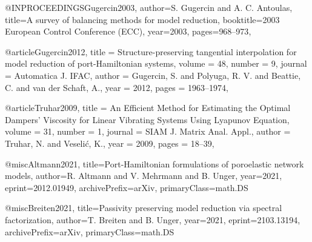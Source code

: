 @INPROCEEDINGS{Gugercin2003,
  author={S. {Gugercin} and A. C. {Antoulas}},
  title={A survey of balancing methods for model reduction}, 
  booktitle={2003 European Control Conference (ECC)}, 
  year={2003},
  pages={968--973},
}

@article{Gugercin2012,
	title = {Structure-preserving tangential interpolation for model reduction of port-{Hamiltonian} systems},
	volume = {48},
	number = {9},
	journal = {Automatica J. IFAC},
	author = {Gugercin, S. and Polyuga, R. V. and Beattie, C. and van der Schaft, A.},
	year = {2012},
	pages = {1963--1974},
}

@article{Truhar2009,
	title = {An Efficient Method for Estimating the Optimal Dampers' Viscosity for Linear Vibrating Systems Using {L}yapunov Equation},
	volume = {31},
	number = {1},
	journal = {SIAM J. Matrix Anal. Appl.},
	author = {Truhar, N. and Veseli\'c, K.},
	year = {2009},
	pages = {18--39},
}

@misc{Altmann2021,
      title={Port-Hamiltonian formulations of poroelastic network models}, 
      author={R. Altmann and V. Mehrmann and B. Unger},
      year={2021},
      eprint={2012.01949},
      archivePrefix={arXiv},
      primaryClass={math.DS}
}

@misc{Breiten2021,
      title={Passivity preserving model reduction via spectral factorization}, 
      author={T. Breiten and B. Unger},
      year={2021},
      eprint={2103.13194},
      archivePrefix={arXiv},
      primaryClass={math.DS}
}
